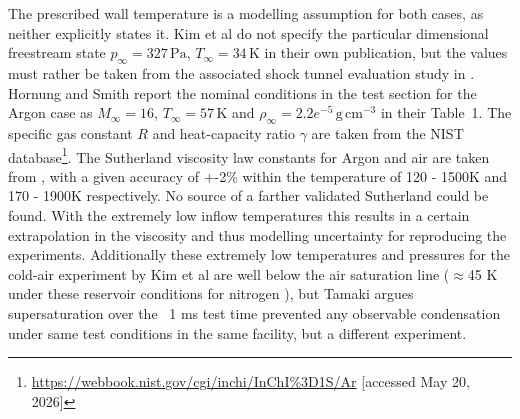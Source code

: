 The prescribed wall temperature is a modelling assumption for both cases, as neither explicitly states it. Kim et al do not specify the particular dimensional freestream state \(p_\infty=327\,\mathrm{Pa}\), \(T_\infty=34\,\mathrm{K}\) in their own publication, but the values must rather be taken from the associated shock tunnel evaluation study in \cite[Run 434, Channel 2 (sonic throat at inlet, AR = 28)]{tamaki1956divergent}. Hornung and Smith report the nominal conditions in the test section for the Argon case as \(M_\infty=16\), \(T_\infty=57\,\mathrm{K}\) and \(\rho_\infty=2.2e^{-5}\,\mathrm{g\,cm^{-3}}\) in their Table~1. The specific gas constant \(R\) and heat-capacity ratio \(\gamma\) are taken from the NIST database\footnote{\url{https://webbook.nist.gov/cgi/inchi/InChI\%3D1S/Ar} [accessed May 20, 2026]}. The Sutherland viscosity law constants for Argon and air are taken from \cite[Table 1-1]{white2006viscous}, with a given accuracy of +-2\% within the temperature of 120 - 1500K and 170 - 1900K respectively. No source of a farther validated Sutherland could be found. With the extremely low inflow temperatures this results in a certain extrapolation in the viscosity and thus modelling uncertainty for reproducing the experiments. Additionally these extremely low temperatures and pressures for the cold-air experiment by Kim et al are well below the air saturation line (\(\approx\)45 K under these reservoir conditions for nitrogen \cite{frels1974vapour}), but Tamaki argues supersaturation over the ~1 ms test time prevented any observable condensation under same test conditions in the same facility, but a different experiment\cite{tamaki1956divergent}.

